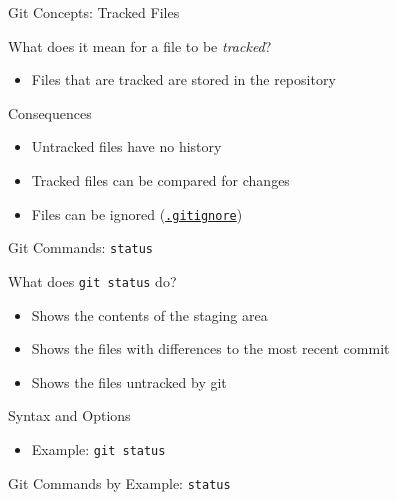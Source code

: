 \documentclass[table,dvipsnames]{beamer}
\begin{document}

\begin{frame}{Git Concepts: Tracked Files}
	\begin{block}{What does it mean for a file to be \emph{tracked}?}
		\begin{itemize}
			\item Files that are tracked are stored in the repository
		\end{itemize}
	\end{block}
	\begin{block}{Consequences}
		\begin{itemize}
			\item Untracked files have no history
			\item Tracked files can be compared for changes
			\item Files can be ignored (\hyperlink{gitignore}{\texttt{.gitignore}})
		\end{itemize}
	\end{block}
\end{frame}

\begin{frame}{Git Commands: \texttt{status}}
	\begin{block}{What does \texttt{git status} do?}
		\begin{itemize}
			\item Shows the contents of the staging area
			\item Shows the files with differences to the most recent commit
			\item Shows the files untracked by git
		\end{itemize}
	\end{block}
	\begin{block}{Syntax and Options}
		\begin{itemize}
			\item Example: \texttt{git status}
		\end{itemize}
	\end{block}
\end{frame}

\begin{frame}{Git Commands by Example: \texttt{status}}
\end{frame}
\end{document}
